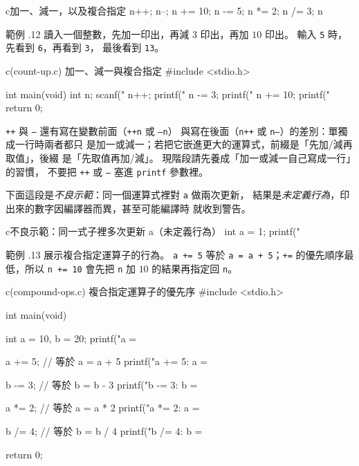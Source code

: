 \begin{code}{c}{加一、減一，以及複合指定}
n++;
n--;
n += 10;
n -= 5;
n *= 2;
n /= 3;
n %
\end{code}

範例 \thechapter.12 讀入一個整數，先加一印出，再減 $3$ 印出，再加
$10$ 印出。 輸入 \texttt{5} 時，先看到 \texttt{6}，再看到 \texttt{3}，
最後看到 \texttt{13}。

\begin{example}{c}{(count-up.c) 加一、減一與複合指定}
#include <stdio.h>

int main(void) {
    int n;
    scanf("%
    n++;
    printf("%
    n -= 3;
    printf("%
    n += 10;
    printf("%
    return 0;
}
\end{example}


\texttt{++} 與 \texttt{--} 還有寫在變數前面（\texttt{++n} 或 \texttt{--n}）
與寫在後面（\texttt{n++} 或 \texttt{n--}）的差別：單獨成一行時兩者都只
是加一或減一；若把它嵌進更大的運算式，前綴是「先加/減再取值」，後綴
是「先取值再加/減」。 現階段請先養成「加一或減一自己寫成一行」的習慣，
不要把 \texttt{++} 或 \texttt{--} 塞進 \texttt{printf} 參數裡。

下面這段是\emph{不良示範}：同一個運算式裡對 \texttt{a} 做兩次更新，
結果是\emph{未定義行為}，印出來的數字因編譯器而異，甚至可能編譯時
就收到警告。

\begin{code}{c}{不良示範：同一式子裡多次更新 a（未定義行為）}
int a = 1;
printf("%
\end{code}

範例 \thechapter.13 展示複合指定運算子的行為。 \texttt{a += 5} 等於
\texttt{a = a + 5}；\texttt{+=} 的優先順序最低，所以 \texttt{n += 10}
會先把 \texttt{n} 加 $10$ 的結果再指定回 \texttt{n}。

\begin{example}{c}{(compound-ops.c) 複合指定運算子的優先序}
#include <stdio.h>

int main(void) {
    int a = 10, b = 20;
    printf("a = %

    a += 5;     // 等於 a = a + 5
    printf("a += 5: a = %

    b -= 3;     // 等於 b = b - 3
    printf("b -= 3: b = %

    a *= 2;     // 等於 a = a * 2
    printf("a *= 2: a = %

    b /= 4;     // 等於 b = b / 4
    printf("b /= 4: b = %

    return 0;
}
\end{example}

